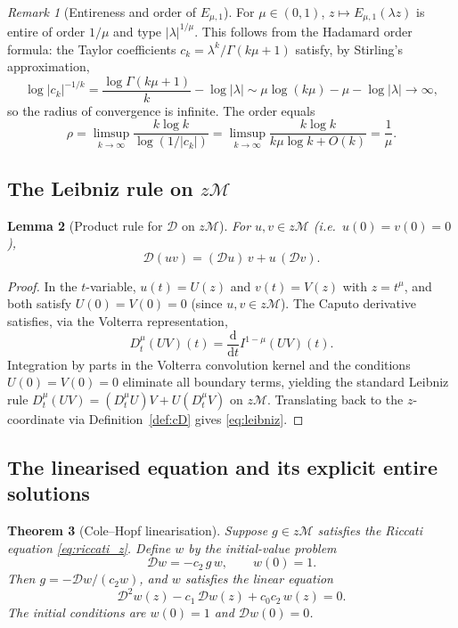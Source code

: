 \documentclass[12pt,a4paper]{amsart}
\newcommand{\dd}{\mathrm{d}}
\newcommand{\ML}[2]{E_{#1,#2}}
\theoremstyle{plain}
\newtheorem{theorem}{Theorem}[section]
\newtheorem{lemma}[theorem]{Lemma}
\theoremstyle{definition}
\theoremstyle{remark}
\newtheorem{remark}[theorem]{Remark}
\begin{document}
\begin{remark}[Entireness and order of $\ML{\mu}{1}$]\label{rem:ML_entire}
For $\mu\in(0,1)$, $z\mapsto\ML{\mu}{1}(\lambda z)$ is entire of order
$1/\mu$ and type $|\lambda|^{1/\mu}$. This follows from the Hadamard order
formula: the Taylor coefficients $c_k=\lambda^k/\Gamma(k\mu+1)$ satisfy, by
Stirling's approximation,
\[
  \log|c_k|^{-1/k}
  =\frac{\log\Gamma(k\mu+1)}{k}-\log|\lambda|
  \sim\mu\log(k\mu)-\mu-\log|\lambda|\to\infty,
\]
so the radius of convergence is infinite. The order equals
\[
  \rho=\limsup_{k\to\infty}\frac{k\log k}{\log(1/|c_k|)}
  =\limsup_{k\to\infty}\frac{k\log k}{k\mu\log k+O(k)}
  =\frac{1}{\mu}.
\]
\end{remark}

\subsection{The Leibniz rule on $z\mathcal{M}$}

\begin{lemma}[Product rule for $\mathcal{D}$ on $z\mathcal{M}$]\label{lem:leibniz}
For $u,v\in z\mathcal{M}$ (i.e.\ $u(0)=v(0)=0$),
\begin{equation}\label{eq:leibniz}
  \mathcal{D}(uv) = (\mathcal{D}u)\,v + u\,(\mathcal{D}v).
\end{equation}
\end{lemma}

\begin{proof}
In the $t$-variable, $u(t)=U(z)$ and $v(t)=V(z)$ with $z=t^\mu$, and both
satisfy $U(0)=V(0)=0$ (since $u,v\in z\mathcal{M}$). The Caputo derivative
satisfies, via the Volterra representation,
\[
  D^\mu_t(UV)(t)
  = \frac{\dd}{\dd t}I^{1-\mu}(UV)(t).
\]
Integration by parts in the Volterra convolution kernel and the conditions
$U(0)=V(0)=0$ eliminate all boundary terms, yielding the standard Leibniz
rule $D^\mu_t(UV)=(D^\mu_t U)V+U(D^\mu_t V)$ on $z\mathcal{M}$.
Translating back to the $z$-coordinate via Definition~\ref{def:cD} gives
\eqref{eq:leibniz}.
\end{proof}

\subsection{The linearised equation and its explicit entire solutions}

\begin{theorem}[Cole--Hopf linearisation]\label{thm:colehopf}
Suppose $g\in z\mathcal{M}$ satisfies the Riccati equation
\eqref{eq:riccati_z}. Define $w$ by the initial-value problem
\begin{equation}\label{eq:w_def_ivp}
  \mathcal{D}w = -c_2\,g\,w,\qquad w(0)=1.
\end{equation}
Then $g=-\mathcal{D}w/(c_2 w)$, and $w$ satisfies the linear equation
\begin{equation}\label{eq:w_ode}
  \mathcal{D}^2 w(z) - c_1\,\mathcal{D}w(z) + c_0 c_2\,w(z) = 0.
\end{equation}
The initial conditions are $w(0)=1$ and $\mathcal{D}w(0)=0$.
\end{theorem}
\end{document}
